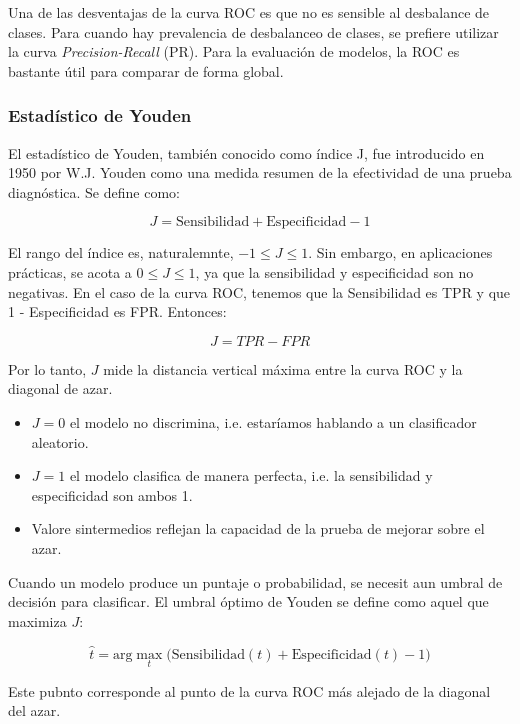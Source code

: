         Una de las desventajas de la curva ROC es que no es sensible al desbalance de clases. Para cuando hay
        prevalencia de desbalanceo de clases, se prefiere utilizar la curva \textit{Precision-Recall} (PR). Para
        la evaluación de modelos, la ROC es bastante útil para comparar de forma global.

    \subsubsection{Estadístico de Youden}

        El estadístico de Youden, también conocido como índice J, fue introducido en 1950 por W.J. Youden como
        una medida resumen de la efectividad de una prueba diagnóstica. Se define como:

        \[
            J = \text{Sensibilidad} + \text{Especificidad} - 1
        \]

        El rango del índice es, naturalemnte, $-1 \leq J \leq 1$. Sin embargo, en aplicaciones prácticas, 
        se acota a $0 \leq J \leq 1$, ya que la sensibilidad y especificidad son no negativas. En el caso de
        la curva ROC, tenemos que la Sensibilidad es TPR y que 1 - Especificidad es FPR. Entonces:

        \[
            J = TPR - FPR
        \]

        Por lo tanto, $J$ mide la distancia vertical máxima entre la curva ROC y la diagonal de azar.

        \begin{itemize}
            \item $J = 0$ el modelo no discrimina, i.e. estaríamos hablando a un clasificador aleatorio.
            \item $J = 1$ el modelo clasifica de manera perfecta, i.e. la sensibilidad y especificidad son ambos 1.
            \item Valore sintermedios reflejan la capacidad de la prueba de mejorar sobre el azar. 
        \end{itemize}

        Cuando un modelo produce un puntaje o probabilidad, se necesit aun umbral de decisión para clasificar. El
        umbral óptimo de Youden se define como aquel que maximiza $J$:

        \[
            \hat{t} = \text{arg} \max_t \bigg(\text{Sensibilidad}(t) + \text{Especificidad}(t) - 1\bigg)
        \]

        Este pubnto corresponde al punto de la curva ROC más alejado de la diagonal del azar. 

